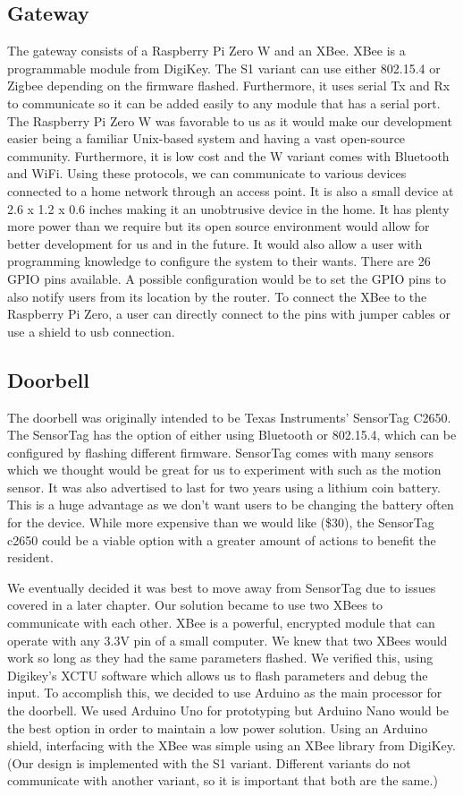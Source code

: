\subsection{Gateway}
The gateway consists of a Raspberry Pi Zero W and an XBee. XBee is a programmable module from DigiKey. The S1 variant can use either 802.15.4 or Zigbee depending on the firmware flashed. Furthermore, it uses serial Tx and Rx to communicate so it can be added easily to any module that has a serial port. The Raspberry Pi Zero W was favorable to us as it would make our development easier being a familiar Unix-based system and having a vast open-source community. Furthermore, it is low cost and the W variant comes with Bluetooth and WiFi. Using these protocols, we can communicate to various devices connected to a home network through an access point. It is also a small device at 2.6 x 1.2 x 0.6 inches making it an unobtrusive device in the home. It has plenty more power than we require but its open source environment would allow for better development for us and in the future. It would also allow a user with programming knowledge to configure the system to their wants. There are 26 GPIO pins available. A possible configuration would be to set the GPIO pins to also notify users from its location by the router. To connect the XBee to the Raspberry Pi Zero, a user can directly connect to the pins with jumper cables or use a shield to usb connection.

\subsection{Doorbell}
The doorbell was originally intended to be Texas Instruments’ SensorTag C2650. The SensorTag has the option of either using Bluetooth or 802.15.4, which can be configured by flashing different firmware. SensorTag comes with many sensors which we thought would be great for us to experiment with such as the motion sensor. It was also advertised to last for two years using a lithium coin battery. This is a huge advantage as we don’t want users to be changing the battery often for the device. While more expensive than we would like (\$30), the SensorTag c2650 could be a viable option with a greater amount of actions to benefit the resident.

    We eventually decided it was best to move away from SensorTag due to issues covered in a later chapter. Our solution became to use two XBees to communicate with each other. XBee is a powerful, encrypted module that can operate with any 3.3V pin of a small computer. We knew that two XBees would work so long as they had the same parameters flashed.  We verified this, using Digikey's XCTU software which allows us to flash parameters and debug the input. To accomplish this, we decided to use Arduino as the main processor for the doorbell. We used Arduino Uno for prototyping but Arduino Nano would be the best option in order to maintain a low power solution. Using an Arduino shield, interfacing with the XBee was simple using an XBee library from DigiKey. (Our design is implemented with the S1 variant. Different variants do not communicate with another variant, so it is important that both are the same.)
    
